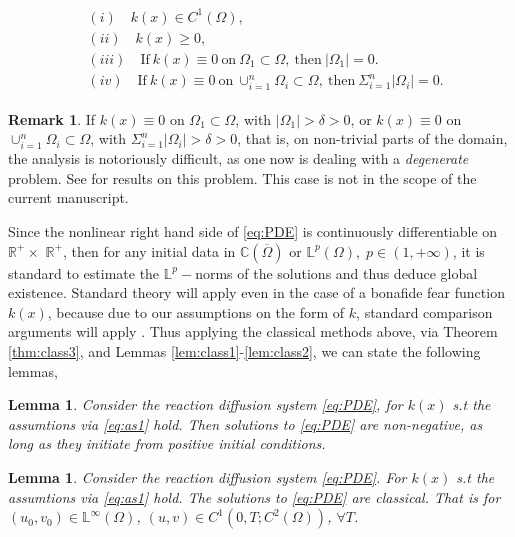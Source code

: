 \documentclass[10pt]{amsart}
\newtheorem{lemma}[theorem]{Lemma}
\theoremstyle{definition}
\newtheorem{remark}{Remark}
\begin{document}
\begin{align}\label{eq:as1}
\begin{split}
	&(i) \quad k(x)  \in C^{1}(\Omega),
	\\
	&(ii) \quad k(x) \geq 0,
	\\
	& (iii)\quad  \mbox{If} \  k(x) \equiv 0 \ \mbox{on}  \ \Omega_{1} \subset \Omega, \ \mbox{then} \ |\Omega_{1}| = 0.
\\
& (iv)\quad  \mbox{If} \  k(x) \equiv 0 \ \mbox{on}  \ \cup^{n}_{i=1}\Omega_{i} \subset \Omega, \ \mbox{then} \ \Sigma^{n}_{i=1}|\Omega_{i}| = 0.
\end{split}
\end{align}

\begin{remark}
If $k(x) \equiv 0$ on $\Omega_{1} \subset \Omega$, with $|\Omega_{1}| > \delta > 0$, or $k(x) \equiv 0$ on $\cup^{n}_{i=1}\Omega_{i} \subset \Omega$, with $\Sigma^{n}_{i=1}|\Omega_{i}| > \delta > 0$, that is, on non-trivial parts of the domain, the analysis is notoriously difficult, as one now is dealing with a \emph{degenerate} problem. See \cite{Du02a, Du02b} for results on this problem. This case is not in the scope of the current manuscript. 
\end{remark}


Since the nonlinear right hand side of \eqref{eq:PDE} is continuously
differentiable on $\mathbb{R}^{+}\times $ $\mathbb{R}^{+}$, then for any
initial data in $\mathbb{C}\left( \overline{\Omega }\right) $ or $\mathbb{L}%
^{p}(\Omega ),\;p\in \left( 1,+\infty \right) $, it is standard to 
estimate the $\mathbb{L}^{p}-$norms of the solutions and thus deduce global existence. Standard theory will apply even in the case of a bonafide fear function $k(x)$, because due to our assumptions on the form of $k$,  standard comparison arguments will apply \cite{Gil77}. Thus applying the classical methods above, via Theorem \ref{thm:class3}, and Lemmas \ref{lem:class1}-\ref{lem:class2}, we can state the following lemmas,


\begin{lemma}
\label{lem:pos1}
Consider the reaction diffusion system \eqref{eq:PDE}, for $k(x)$ s.t the assumtions via \eqref{eq:as1} hold. Then solutions to \eqref{eq:PDE} are non-negative, as long as they initiate from positive initial conditions.
\end{lemma}


\begin{lemma}
\label{lem:cl1}
Consider the reaction diffusion system \eqref{eq:PDE}. For $k(x)$ s.t the assumtions via \eqref{eq:as1} hold. The solutions to \eqref{eq:PDE} are classical. That is for $(u_{0},v_{0}) \in \mathbb{L}^{\infty }(\Omega )$,  $(u,v) \in C^{1}(0,T; C^{2}(\Omega))$, $\forall T$.
\end{lemma}
\end{document}
